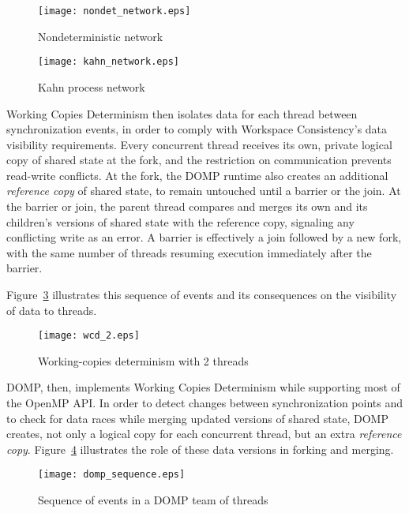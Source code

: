 \begin{figure}[htpb]
\centering
\texttt{[image: nondet\_network.eps]}
\caption{Nondeterministic network}
\label{fig:design-nondet-network}
\end{figure}

\begin{figure}
\centering
\texttt{[image: kahn\_network.eps]}
\caption{Kahn process network}
\label{fig:design-kahn-network}
\end{figure}

Working Copies Determinism then isolates data for each thread between synchronization events, in order to comply with Workspace Consistency's data visibility requirements.  Every concurrent thread receives its own, private logical copy of shared state at the fork, and the restriction on communication prevents read-write conflicts.  At the fork, the DOMP runtime also creates an additional \textit{reference copy} of shared state, to remain untouched until a barrier or the join.  At the barrier or join, the parent thread compares and merges its own and its children's versions of shared state with the reference copy, signaling any conflicting write as an error.  
A barrier is effectively a join followed by a new fork, with the same number of threads resuming execution immediately after the barrier.  

Figure~\ref{fig:wcd} illustrates this sequence of events and its consequences on the visibility of data to threads.   
\begin{figure}[tbp]
\begin{center}
\texttt{[image: wcd\_2.eps]}
\caption{Working-copies determinism with 2 threads}
\label{fig:wcd}
\end{center}
\end{figure}

DOMP, then, implements Working Copies Determinism while supporting most of the OpenMP API.  In order to detect changes between synchronization points and to check for data races while merging updated versions of shared state, DOMP creates, not only a logical copy for each concurrent thread, but an extra \textit{reference copy}.
Figure~\ref{fig:design-comp-sequence} illustrates the role of these data versions in forking and merging.

\begin{figure}[tbp]
\begin{center}
\texttt{[image: domp\_sequence.eps]}
\caption{Sequence of events in a DOMP team of threads}
\label{fig:design-comp-sequence}
\end{center}
\end{figure}

